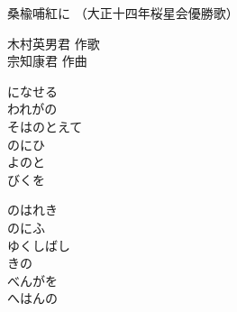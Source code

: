 \documentclass[10pt,b5j]{tarticle} %
\begin{document}
\begin{minipage}[c]{0.7\hsize} %
    \begin{center}
        {\LARGE
            桑楡哺紅に %
        }
        {\small 
            （大正十四年桜星会優勝歌） %
        }
    \end{center}
\end{minipage}
\begin{minipage}[c]{0.3\hsize} %
    \begin{flushright} %
        木村英男君 作歌\\宗知康君 作曲 %
    \end{flushright}
\end{minipage}

\vspace{1.5em} %
\newcommand{\linespace}{0.5em} %
\newcommand{\blocksize}{0.5\hsize} %
\begin{enumerate} %
    \begin{minipage}[c]{\blocksize}
    
        \vspace{\linespace}
        \item
        になせる\\
        われがの\\
        そはのとえて\\
        のにひ\\
        よのと\\
        びくを
        
        \vspace{\linespace}
        \item
        のはれき\\
        のにふ\\
        ゆくしばし\\
        きの\\
        べんがを\\
        へはんの
    
    \end{minipage}
\end{enumerate} %
\end{document}
